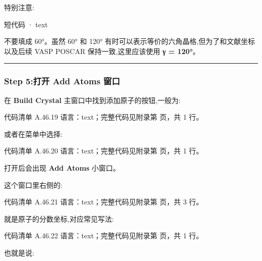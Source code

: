 \documentclass[lang=cn,scheme=chinese,color=blue,device=normal,toc=onecol,math=cm]{elegantbook}
\begin{document}
特别注意:\par


\begin{inlinecodebox}{短代码 · text}
\end{inlinecodebox}


不要填成 60°。虽然 60° 和 120° 有时可以表示等价的六角晶格,但为了和文献坐标以及后续 VASP POSCAR 保持一致,这里应该使用 \textbf{γ = 120°}。\par


\medskip\hrule\medskip


\subsubsection{Step 5:打开 Add Atoms 窗口}


在 \textbf{Build Crystal} 主窗口中找到添加原子的按钮,一般为:\par


\begin{codeindexbox}{代码清单 A.46.19}
语言：text；完整代码见附录第 \pageref{code:46:19} 页，共 1 行。
\end{codeindexbox}


或者在菜单中选择:\par


\begin{codeindexbox}{代码清单 A.46.20}
语言：text；完整代码见附录第 \pageref{code:46:20} 页，共 1 行。
\end{codeindexbox}


打开后会出现 \textbf{Add Atoms} 小窗口。\par


这个窗口里右侧的:\par


\begin{codeindexbox}{代码清单 A.46.21}
语言：text；完整代码见附录第 \pageref{code:46:21} 页，共 3 行。
\end{codeindexbox}


就是原子的分数坐标,对应常见写法:\par


\begin{codeindexbox}{代码清单 A.46.22}
语言：text；完整代码见附录第 \pageref{code:46:22} 页，共 1 行。
\end{codeindexbox}


也就是说:\par
\end{document}
